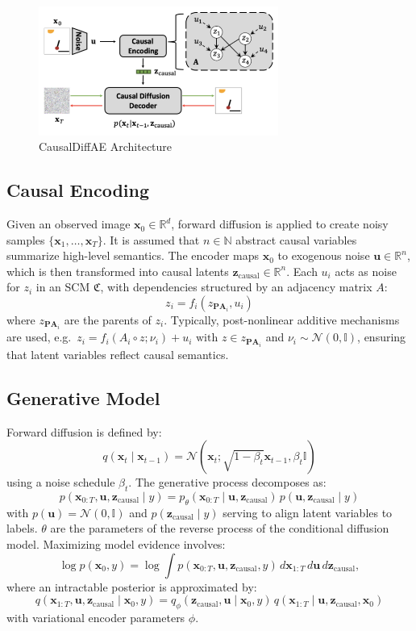 \documentclass{article}
\newcommand{\x}{\mathbf{x}}
\newcommand{\ub}{\mathbf{u}}
\newcommand{\zc}{\textbf{z}_\text{causal}}
\newcommand{\C}{\mathfrak{C}}
\newcommand{\N}{\mathcal{N}}
\begin{document}
	\begin{figure}[H]
		\centering
		\includegraphics[width=0.7\textwidth]{causaldiffae_architecture} 
		\caption{CausalDiffAE Architecture}
		\label{fig:causaldiffae_architecture}
	\end{figure}
	
	\subsection*{Causal Encoding}
	
	Given an observed image $\x_0 \in \mathbb{R}^d$, forward diffusion is applied to create noisy samples $\{\x_1, \ldots, \x_T\}$. It is assumed that $n \in \mathbb{N}$ abstract causal variables summarize high-level semantics. The encoder maps $\x_0$ to exogenous noise $\ub \in \mathbb{R}^n$, which is then transformed into causal latents $\zc \in \mathbb{R}^n$. Each $u_i$ acts as noise for $z_i$ in an SCM $\C$, with dependencies structured by an adjacency matrix $A$:
	$$
	z_i = f_i(z_{\mathbf{PA}_i}, u_i)
	$$
	where $z_{\mathbf{PA}_i}$ are the parents of $z_i$. Typically, post-nonlinear additive mechanisms are used, e.g.\ $z_i = f_i(A_i \circ z; \nu_i) + u_i \text{ with } z \in z_{\mathbf{PA}_i}$ and $\nu_i \sim \N(0, \mathbb{I})$, ensuring that latent variables reflect causal semantics.
	
	\subsection*{Generative Model}
	
	Forward diffusion is defined by:
	$$
	q(\x_t \mid \x_{t-1}) = \N(\x_t ; \sqrt{1-\beta_t}\x_{t-1}, \beta_t \mathbb{I})
	$$
	using a noise schedule $\beta_t$. The generative process decomposes as:
	$$
	p(\x_{0:T}, \ub, \zc \mid y) = p_{\theta}(\x_{0:T} \mid \ub, \zc)\, p(\ub, \zc \mid y)
	$$
	with $p(\ub) = \N(0, \mathbb{I})$ and $p(\zc \mid y)$ serving to align latent variables to labels. $\theta$ are the parameters of the reverse process of the conditional diffusion model. Maximizing model evidence involves:
	$$
	\log p(\x_0, y) = \log \int p(\x_{0:T}, \ub, \zc, y) \, d\x_{1:T} \, d\ub\, d\zc,
	$$
	where an intractable posterior is approximated by:
	$$
	q(\x_{1:T}, \ub, \zc \mid \x_0, y) = q_\phi(\zc, \ub \mid \x_0, y)\, q(\x_{1:T} \mid \ub, \zc, \x_0)
	$$
	with variational encoder parameters $\phi$.
	
\end{document}

